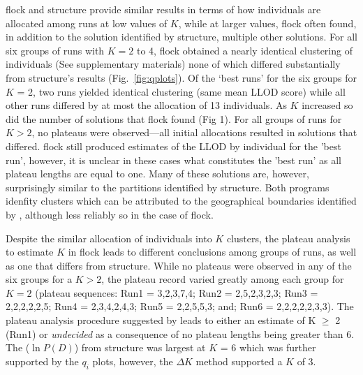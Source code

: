 {\sc flock} and {\sc structure} provide similar results in 
terms of how individuals are allocated among runs at low values of $K$, 
while at larger values, {\sc flock} often found, in addition to the solution identified by {\sc structure}, 
multiple other solutions. For all six groups 
of runs with $K = 2$ to 4, {\sc flock} obtained a nearly identical clustering of individuals 
(See supplementary materials) none of which differed substantially from {\sc structure}'s results
(Fig.~\ref{fig:qplots}). Of the `best runs' for the six groups for $K$ = 2, two  
runs yielded identical clustering (same mean LLOD score) while all other runs 
differed by at most the allocation of 13 individuals. As 
$K$ increased so did the number of solutions
that {\sc flock} found (Fig 1). For all groups of runs for $K > 2$, no plateaus were observed---all initial 
allocations resulted in solutions that differed. 
{\sc flock} still produced estimates of the LLOD by individual for the 
'best run', however, it is unclear in these cases what constitutes the 'best run' as all plateau lengths are 
equal to one. Many of these solutions are, however, surprisingly similar to
the partitions identified by {\sc structure}. Both programs idenfity clusters 
which can be attributed to the geographical boundaries identified by \citet{Garzaetal_norcal},
although less reliably so in the case of {\sc flock}.

Despite the similar allocation of individuals into $K$ clusters, the 
plateau analysis to estimate $K$ in {\sc flock} leads to different conclusions among groups of runs, as well as 
one that differs from {\sc structure}. While no plateaus were observed in any of the six groups 
for a $K > 2$, the plateau record varied greatly among each
group for $K = 2$ (plateau sequences: Run1 = 3,2,3,7,4; Run2 = 2,5,2,3,2,3; Run3 = 2,2,2,2,2,5; 
Run4 = 2,3,4,2,4,3; Run5 = 2,2,5,5,3; and; Run6 = 2,2,2,2,2,3,3). The plateau analysis 
procedure suggested by \citet{Duc&Tur2012} leads to
either an estimate of K $\geq$ 2 (Run1) or {\em undecided} as a consequence of no plateau 
lengths being greater than 6. The ($\ln P(D)$) from {\sc structure}
was largest at $K$ = 6 which was further supported by the $q_i$ plots, however,
the $\Delta K$ method supported a $K$ of 3.
 


